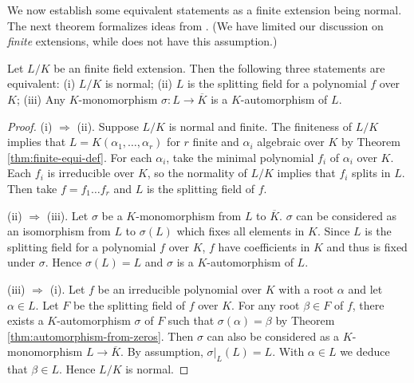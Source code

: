 We now establish some equivalent statements as a finite extension being normal. The next theorem formalizes ideas from \cite[Lecture~6]{galois-theory-lectures}. (We have limited our discussion on \textit{finite} extensions, while \cite{galois-theory-lectures} does not have this assumption.)

\begin{theorem} \label{thm:normal-equiv-def}
    Let $L/K$ be an finite field extension. Then the following three statements are equivalent: (i) $L/K$ is normal; 
    (ii) $L$ is the splitting field for a polynomial $f$ over $K$; 
    (iii) Any $K$-monomorphism $\sigma: L \to \overline K$ is a $K$-automorphism of $L$. 
\end{theorem}

\begin{proof}
    (i) $\Rightarrow$ (ii). 
    Suppose $L/K$ is normal and finite. The finiteness of $L/K$ implies that $L = K(\alpha_1, \dots, \alpha_r)$ for $r$ finite and $\alpha_i$ algebraic over $K$ by Theorem \ref{thm:finite-equi-def}. For each $\alpha_i$, take the minimal polynomial $f_i$ of $\alpha_i$ over $K$. Each $f_i$ is irreducible over $K$, so the normality of $L/K$ implies that $f_i$ splits in $L$.  Then take $f = f_1 \dots f_r$ and $L$ is the splitting field of $f$.
	
    

    (ii) $\Rightarrow$ (iii). Let $\sigma$ be a $K$-monomorphism from $L$ to $\overline K$. $\sigma$ can be considered as an isomorphism from $L$ to $\sigma(L)$ which fixes all elements in $K$. Since $L$ is the splitting field for a polynomial $f$ over $K$, $f$ have coefficients in $K$ and thus is fixed under $\sigma$. Hence $\sigma(L) = L$ and $\sigma$ is a $K$-automorphism of $L$. 
    
    (iii) $\Rightarrow$ (i). Let $f$ be an irreducible polynomial over $K$ with a root $\alpha$ and let $\alpha \in L$. Let $F$ be the splitting field of $f$ over $K$. For any root $\beta \in F$ of $f$, there exists a $K$-automorphism $\sigma$ of $F $ such that $\sigma(\alpha) = \beta$ by Theorem \ref{thm:automorphism-from-zeros}. Then $\sigma$ can also be considered as a $K$-monomorphism $L \to \overline K$. By assumption, $\sigma|_L(L) = L$. With $\alpha \in L$ we deduce that $\beta \in L$. Hence $L/K$ is normal.
\end{proof}

